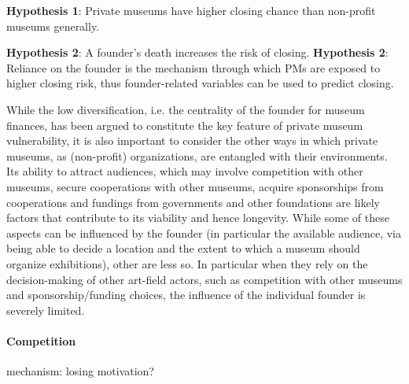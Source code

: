 \documentclass[12pt]{article}
\begin{document}
\textbf{Hypothesis 1}: Private museums have higher closing chance than non-profit museums generally.

\textbf{Hypothesis 2}: A founder's death increases the risk of closing.
\textbf{Hypothesis 2}: Reliance on the founder is the mechanism through which PMs are exposed to higher closing risk, thus founder-related variables can be used to predict closing. 



While the low diversification, i.e. the centrality of the founder for museum finances, has been argued to constitute the key feature of private museum vulnerability, it is also important to consider the other ways in which private museums, as (non-profit) organizations, are entangled with their environments.
Its ability to attract audiences, which may involve competition with other museums, secure cooperations with other museums, acquire sponsorships from cooperations and fundings from governments and other foundations are likely factors that contribute to its viability and hence longevity.
While some of these aspects can be influenced by the founder (in particular the available audience, via being able to decide a location and the extent to which a museum should organize exhibitions), other are less so.
In particular when they rely on the decision-making of other art-field actors, such as competition with other museums and sponsorship/funding choices, the influence of the individual founder is severely limited.
\paragraph*{Competition}




mechanism: losing motivation?
\end{document}
